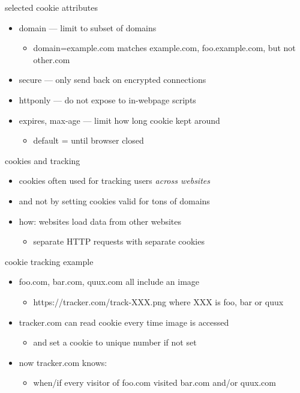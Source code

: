 \begin{frame}{selected cookie attributes}
\begin{itemize}
\item domain --- limit to subset of domains
    \begin{itemize}
    \item domain=example.com matches example.com, foo.example.com, but not other.com
    \end{itemize}
\item secure --- only send back on encrypted connections
\item httponly --- do not expose to in-webpage scripts
\item expires, max-age --- limit how long cookie kept around
    \begin{itemize}
    \item default = until browser closed
    \end{itemize}
\end{itemize}
\end{frame}

\begin{frame}{cookies and tracking}
    \begin{itemize}
    \item cookies often used for tracking users \textit{across websites}
    \item and not by setting cookies valid for tons of domains
    \vspace{.5cm}
    \item how: websites load data from other websites
        \begin{itemize}
        \item separate HTTP requests with separate cookies
        \end{itemize}
    \end{itemize}
\end{frame}

\begin{frame}{cookie tracking example}
\begin{itemize}
\item foo.com, bar.com, quux.com all include an image
    \begin{itemize}
    \item https://tracker.com/track-XXX.png where XXX is foo, bar or quux
    \end{itemize}
\item tracker.com can read cookie every time image is accessed
    \begin{itemize}
    \item and set a cookie to unique number if not set
    \end{itemize}
\item now tracker.com knows:
    \begin{itemize}
    \item when/if every visitor of foo.com visited bar.com and/or quux.com
    \end{itemize}
\end{itemize}
\end{frame}

